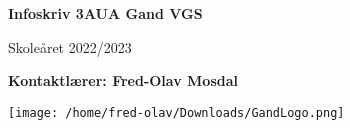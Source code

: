 \begin{titlepage}
   \begin{center}
       \vspace*{1cm}

       \textbf{Infoskriv 3AUA Gand VGS}

       \vspace{0.5cm}
        Skoleåret 2022/2023
            
       \vspace{1.5cm}

       \textbf{Kontaktlærer: Fred-Olav Mosdal}

       \vfill
            
            
     
       \texttt{[image: /home/fred-olav/Downloads/GandLogo.png]}
    \vfill        
            
   \end{center}
\end{titlepage}
